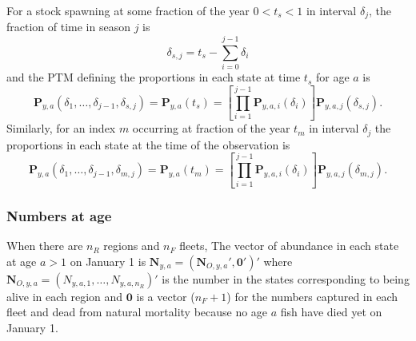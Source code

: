 \documentclass[
]{article}
\begin{document}
For a stock spawning at some fraction of the year \(0<t_s<1\) in
interval \(\delta_j\), the fraction of time in season \(j\) is
\[\delta_{s,j} = t_s-\sum^{j-1}_{i=0}\delta_i
\] and the PTM defining the proportions in each state at time \(t_s\)
for age \(a\) is \begin{equation}\label{eq:ptm_spawn}
\mathbf{P}_{y,a}\left(\delta_1,\ldots,\delta_{j-1}, \delta_{s,j}\right) = \mathbf{P}_{y,a}\left(t_s\right) =  \left[\prod^{j-1}_{i=1}\mathbf{P}_{y,a,i}(\delta_i)\right]\mathbf{P}_{y,a,j}(\delta_{s,j}).
\end{equation} Similarly, for an index \(m\) occurring at fraction of
the year \(t_m\) in interval \(\delta_j\) the proportions in each state
at the time of the observation is \begin{equation} \label{eq:ptm_index} 
\mathbf{P}_{y,a}\left(\delta_1,\ldots,\delta_{j-1}, \delta_{m,j}\right) = \mathbf{P}_{y,a}\left(t_m\right) =   \left[\prod^{j-1}_{i=1}\mathbf{P}_{y,a,i}(\delta_i)\right]\mathbf{P}_{y,a,j}(\delta_{m,j}).
\end{equation}

\hypertarget{numbers-at-age}{%
\subsubsection*{Numbers at age}\label{numbers-at-age}}

When there are \(n_R\) regions and \(n_F\) fleets, The vector of
abundance in each state at age \(a>1\) on January 1 is
\(\mathbf{N}_{y,a} = (\mathbf{N}_{O,y,a}', \mathbf{0}')'\) where
\(\mathbf{N}_{O,y,a} = (N_{y,a,1}, \ldots, N_{y,a,n_R})'\) is the number
in the states corresponding to being alive in each region and
\(\mathbf{0}\) is a vector (\(n_F+1\)) for the numbers captured in each
fleet and dead from natural mortality because no age \(a\) fish have
died yet on January 1.
\end{document}
